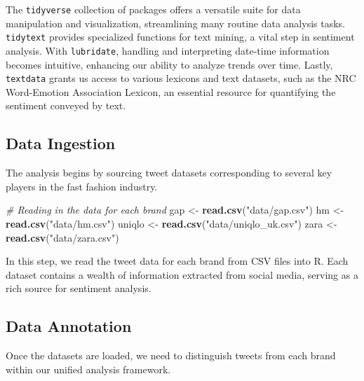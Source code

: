 \documentclass[
]{book}
\newenvironment{Shaded}{\begin{snugshade}}{\end{snugshade}}
\newcommand{\CommentTok}[1]{\textcolor[rgb]{0.56,0.35,0.01}{\textit{#1}}}
\newcommand{\FunctionTok}[1]{\textcolor[rgb]{0.13,0.29,0.53}{\textbf{#1}}}
\newcommand{\NormalTok}[1]{#1}
\newcommand{\OtherTok}[1]{\textcolor[rgb]{0.56,0.35,0.01}{#1}}
\newcommand{\StringTok}[1]{\textcolor[rgb]{0.31,0.60,0.02}{#1}}
\begin{document}
The \texttt{tidyverse} collection of packages offers a versatile suite for data manipulation and visualization, streamlining many routine data analysis tasks. \texttt{tidytext} provides specialized functions for text mining, a vital step in sentiment analysis. With \texttt{lubridate}, handling and interpreting date-time information becomes intuitive, enhancing our ability to analyze trends over time. Lastly, \texttt{textdata} grants us access to various lexicons and text datasets, such as the NRC Word-Emotion Association Lexicon, an essential resource for quantifying the sentiment conveyed by text.

\hypertarget{data-ingestion-1}{%
\subsection*{Data Ingestion}\label{data-ingestion-1}}

The analysis begins by sourcing tweet datasets corresponding to several key players in the fast fashion industry.

\begin{Shaded}
\begin{Highlighting}[]
\CommentTok{\# Reading in the data for each brand}
\NormalTok{gap }\OtherTok{\textless{}{-}} \FunctionTok{read.csv}\NormalTok{(}\StringTok{"data/gap.csv"}\NormalTok{)}
\NormalTok{hm }\OtherTok{\textless{}{-}} \FunctionTok{read.csv}\NormalTok{(}\StringTok{"data/hm.csv"}\NormalTok{)}
\NormalTok{uniqlo }\OtherTok{\textless{}{-}} \FunctionTok{read.csv}\NormalTok{(}\StringTok{"data/uniqlo\_uk.csv"}\NormalTok{)}
\NormalTok{zara }\OtherTok{\textless{}{-}} \FunctionTok{read.csv}\NormalTok{(}\StringTok{"data/zara.csv"}\NormalTok{)}
\end{Highlighting}
\end{Shaded}

In this step, we read the tweet data for each brand from CSV files into R. Each dataset contains a wealth of information extracted from social media, serving as a rich source for sentiment analysis.

\hypertarget{data-annotation-1}{%
\subsection*{Data Annotation}\label{data-annotation-1}}

Once the datasets are loaded, we need to distinguish tweets from each brand within our unified analysis framework.
\end{document}
